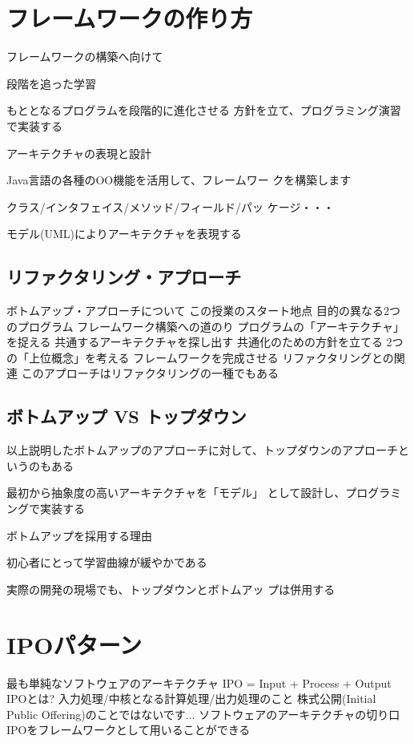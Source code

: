 \documentclass[a4j,papersize]{jsbook}
\begin{document}
\section{フレームワークの作り方}
フレームワークの構築へ向けて

段階を追った学習

もととなるプログラムを段階的に進化させる
方針を立て、プログラミング演習で実装する

アーキテクチャの表現と設計

Java言語の各種のOO機能を活用して、フレームワー
クを構築します

クラス/インタフェイス/メソッド/フィールド/パッ
ケージ・・・

モデル(UML)によりアーキテクチャを表現する

\subsection{リファクタリング・アプローチ}

ボトムアップ・アプローチについて
この授業のスタート地点
 目的の異なる2つのプログラム
フレームワーク構築への道のり
 プログラムの「アーキテクチャ」を捉える
 共通するアーキテクチャを探し出す
 共通化のための方針を立てる
 2つの「上位概念」を考える
 フレームワークを完成させる
リファクタリングとの関連
 このアプローチはリファクタリングの一種でもある

\subsection{ボトムアップ VS トップダウン}

以上説明したボトムアップのアプローチに対して、トップダウンのアプローチというのもある

最初から抽象度の高いアーキテクチャを「モデル」
として設計し、プログラミングで実装する

ボトムアップを採用する理由

初心者にとって学習曲線が緩やかである

実際の開発の現場でも、トップダウンとボトムアッ
プは併用する

\section{IPOパターン}

最も単純なソフトウェアのアーキテクチャ
 IPO = Input + Process + Output
IPOとは?
 入力処理/中核となる計算処理/出力処理のこと
 株式公開(Initial Public Offering)のことではないです...
ソフトウェアのアーキテクチャの切り口
 IPOをフレームワークとして用いることができる
\end{document}
